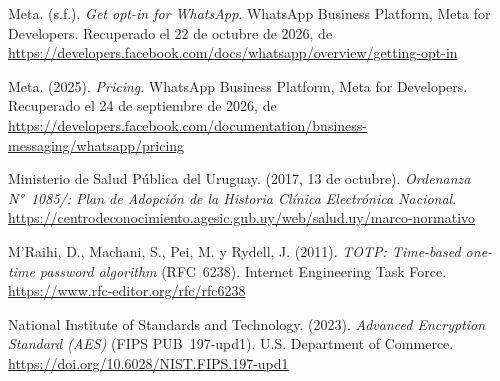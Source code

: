 \documentclass[12pt, a4paper]{article}
\begin{document}
\begin{list}{}{\setlength{\leftmargin}{1.27cm}\setlength{\itemindent}{-1.27cm}%
  \setlength{\labelwidth}{0pt}\setlength{\labelsep}{0pt}\setlength{\itemsep}{6pt}}
 
\item Meta. (s.f.). \textit{Get opt-in for WhatsApp}. WhatsApp Business
  Platform, Meta for Developers. Recuperado el 22 de octubre de 2026, de \url{https://developers.facebook.com/docs/whatsapp/overview/getting-opt-in}
 
 
\item Meta. (2025). \textit{Pricing}. WhatsApp Business Platform,
  Meta for Developers. Recuperado el 24 de septiembre de 2026, de
\url{https://developers.facebook.com/documentation/business-messaging/whatsapp/pricing}
 
 
\item Ministerio de Salud Pública del Uruguay. (2017, 13 de
  octubre). \textit{Ordenanza N°~1085/: Plan de Adopción de la
  Historia Clínica
  Electrónica Nacional}.
\url{https://centrodeconocimiento.agesic.gub.uy/web/salud.uy/marco-normativo}



\item M'Raihi, D., Machani, S., Pei, M. y Rydell, J. (2011). \textit{TOTP:
  Time-based one-time password algorithm} (RFC~6238). Internet
  Engineering Task Force. \url{https://www.rfc-editor.org/rfc/rfc6238}
 
 
\item National Institute of Standards and Technology. (2023).
  \textit{Advanced Encryption Standard (AES)} (FIPS PUB~197-upd1).
  U.S. Department of Commerce.
  \url{https://doi.org/10.6028/NIST.FIPS.197-upd1}



\end{list}
\end{document}
